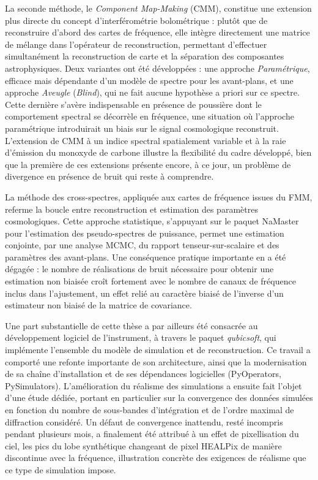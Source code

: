 La seconde méthode, le \emph{Component Map-Making} (CMM), constitue une extension plus directe du concept d'interférométrie bolométrique : plutôt que de reconstruire d'abord des cartes de fréquence, elle intègre directement une matrice de mélange dans l'opérateur de reconstruction, permettant d'effectuer simultanément la reconstruction de carte et la séparation des composantes astrophysiques. Deux variantes ont été développées : une approche \emph{Paramétrique}, efficace mais dépendante d'un modèle de spectre pour les avant-plans, et une approche \emph{Aveugle} (\emph{Blind}), qui ne fait aucune hypothèse a priori sur ce spectre. Cette dernière s'avère indispensable en présence de poussière dont le comportement spectral se décorrèle en fréquence, une situation où l'approche paramétrique introduirait un biais sur le signal cosmologique reconstruit. L'extension de CMM à un indice spectral spatialement variable et à la raie d'émission du monoxyde de carbone illustre la flexibilité du cadre développé, bien que la première de ces extensions présente encore, à ce jour, un problème de divergence en présence de bruit qui reste à comprendre.

La méthode des cross-spectres, appliquée aux cartes de fréquence issues du FMM, referme la boucle entre reconstruction et estimation des paramètres cosmologiques. Cette approche statistique, s'appuyant sur le paquet NaMaster pour l'estimation des pseudo-spectres de puissance, permet une estimation conjointe, par une analyse MCMC, du rapport tenseur-sur-scalaire et des paramètres des avant-plans. Une conséquence pratique importante en a été dégagée : le nombre de réalisations de bruit nécessaire pour obtenir une estimation non biaisée croît fortement avec le nombre de canaux de fréquence inclus dans l'ajustement, un effet relié au caractère biaisé de l'inverse d'un estimateur non biaisé de la matrice de covariance.

Une part substantielle de cette thèse a par ailleurs été consacrée au développement logiciel de l'instrument, à travers le paquet \emph{qubicsoft}, qui implémente l'ensemble du modèle de simulation et de reconstruction. Ce travail a comporté une refonte importante de son architecture, ainsi que la modernisation de sa chaîne d'installation et de ses dépendances logicielles (PyOperators, PySimulators). L'amélioration du réalisme des simulations a ensuite fait l'objet d'une étude dédiée, portant en particulier sur la convergence des données simulées en fonction du nombre de sous-bandes d'intégration et de l'ordre maximal de diffraction considéré. Un défaut de convergence inattendu, resté incompris pendant plusieurs mois, a finalement été attribué à un effet de pixellisation du ciel, les pics du lobe synthétique changeant de pixel HEALPix de manière discontinue avec la fréquence, illustration concrète des exigences de réalisme que ce type de simulation impose.

